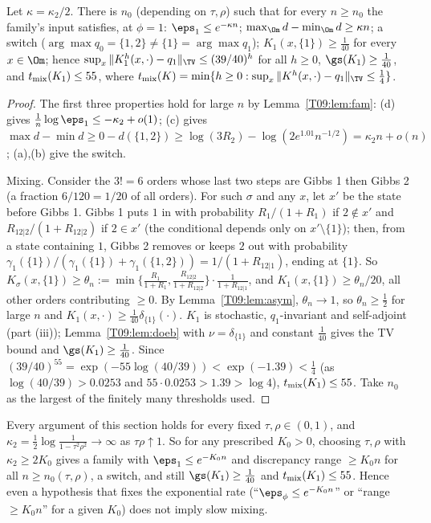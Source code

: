 \documentclass[11pt]{report}
\begin{document}
\begin{T09proposition}\label{T09:prop:v}
Let $\kappa=\kappa_2/2$. There is $n_0$ (depending on $\tau,\rho$) such that for every $n\ge n_0$ the family's input satisfies, at $\phi=1$: $\eps_1\le e^{-\kappa n}$; $\max_\Om d-\min_\Om d\ge\kappa n$; a switch ($\arg\max q_0=\{1,2\}\neq\{1\}=\arg\max q_1$); $K_1(x,\{1\})\ge\frac1{40}$ for every $x\in\Om$; hence $\sup_x\|K_1^h(x,\cdot)-q_1\|_\TV\le(39/40)^h$ for all $h\ge0$, $\gs(K_1)\ge\frac1{40}$, and $t_{\rm mix}(K_1)\le55$, where $t_{\rm mix}(K)=\min\{h\ge0:\sup_x\|K^h(x,\cdot)-q_1\|_\TV\le\frac14\}$.
\end{T09proposition}
\begin{proof}
The first three properties hold for large $n$ by Lemma~\ref{T09:lem:fam}: (d) gives $\frac1n\log\eps_1\le-\kappa_2+o(1)$; (c) gives $\max d-\min d\ge0-d(\{1,2\})\ge\log(3R_2)-\log(2e^{1.01}n^{-1/2})=\kappa_2n+o(n)$; (a),(b) give the switch.

Mixing. Consider the $3!=6$ orders whose last two steps are Gibbs 1 then Gibbs 2 (a fraction $6/120=1/20$ of all orders). For such $\sigma$ and any $x$, let $x'$ be the state before Gibbs 1. Gibbs 1 puts $1$ in with probability $R_1/(1+R_1)$ if $2\notin x'$ and $R_{12|2}/(1+R_{12|2})$ if $2\in x'$ (the conditional depends only on $x'\setminus\{1\}$); then, from a state containing $1$, Gibbs 2 removes or keeps $2$ out with probability $\gamma_1(\{1\})/(\gamma_1(\{1\})+\gamma_1(\{1,2\}))=1/(1+R_{12|1})$, ending at $\{1\}$. So $K_\sigma(x,\{1\})\ge\theta_n:=\min\{\frac{R_1}{1+R_1},\frac{R_{12|2}}{1+R_{12|2}}\}\cdot\frac1{1+R_{12|1}}$, and $K_1(x,\{1\})\ge\theta_n/20$, all other orders contributing $\ge0$. By Lemma~\ref{T09:lem:asym}, $\theta_n\to1$, so $\theta_n\ge\frac12$ for large $n$ and $K_1(x,\cdot)\ge\frac1{40}\delta_{\{1\}}(\cdot)$. $K_1$ is stochastic, $q_1$-invariant and self-adjoint (part (iii)); Lemma~\ref{T09:lem:doeb} with $\nu=\delta_{\{1\}}$ and constant $\frac1{40}$ gives the TV bound and $\gs(K_1)\ge\frac1{40}$. Since $(39/40)^{55}=\exp(-55\log(40/39))<\exp(-1.39)<\frac14$ (as $\log(40/39)>0.0253$ and $55\cdot0.0253>1.39>\log4$), $t_{\rm mix}(K_1)\le55$. Take $n_0$ as the largest of the finitely many thresholds used.
\end{proof}

\begin{T09remark}\label{T09:rem:rate}
Every argument of this section holds for every fixed $\tau,\rho\in(0,1)$, and $\kappa_2=\frac12\log\frac1{1-\tau^2\rho^2}\to\infty$ as $\tau\rho\uparrow1$. So for any prescribed $K_0>0$, choosing $\tau,\rho$ with $\kappa_2\ge2K_0$ gives a family with $\eps_1\le e^{-K_0n}$ and discrepancy range $\ge K_0n$ for all $n\ge n_0(\tau,\rho)$, a switch, and still $\gs(K_1)\ge\frac1{40}$ and $t_{\rm mix}(K_1)\le55$. Hence even a hypothesis that fixes the exponential rate (``$\eps_\phi\le e^{-K_0n}$'' or ``range $\ge K_0n$'' for a given $K_0$) does not imply slow mixing.
\end{T09remark}
\end{document}
